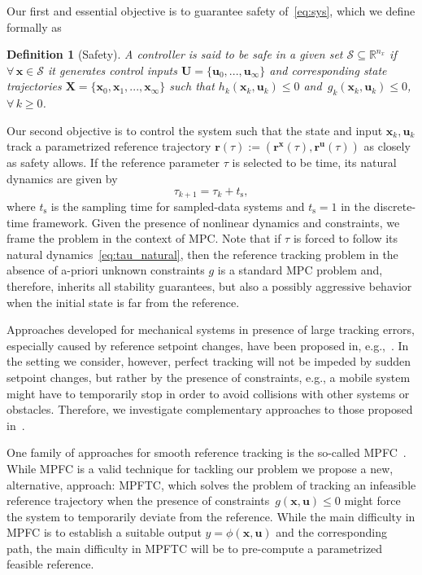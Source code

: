 \documentclass[journal]{IEEEtran}
\newcommand{\x}{{\mathbf{x}}}
\renewcommand{\u}{{\mathbf{u}}}
\renewcommand{\r}{{\mathbf{r}}}
\newcommand{\review}[1]{#1}
\newtheorem{Definition}{Definition}
\begin{document}
	Our first and essential objective is to guarantee safety of~\eqref{eq:sys}, which we define formally as
	
	\begin{Definition}[Safety]\label{def:safe}
		A controller is said to be safe in a given set $\mathcal{S}\subseteq\mathbb{R}^{n_x}$ if $\forall \, \x\in\mathcal{S}$ it generates control inputs $\mathbf{U}=\{\u_0,...,\u_\infty\}$ and corresponding state trajectories $\mathbf{X}=\{\x_0,\x_1,...,\x_\infty\}$ such that $h_k(\x_k,\u_k)\leq{}0$ and~$g_k(\x_k,\u_k)\leq{}0$, $\forall \, k \geq 0$.
	\end{Definition}
	\review{Our second objective is to control the system such that the state and input $\x_k, \u_k$ track a parametrized reference trajectory $\r(\tau)\review{:=}(\r^\x(\tau),\r^\u(\tau))$ as closely as safety allows.} If the reference parameter $\tau$ is selected to be time, its natural dynamics are given by
	\begin{equation}
	\label{eq:tau_natural}
	\tau_{k+1} = \tau_k + t_\mathrm{s},
	\end{equation}
	where $t_\mathrm{s}$ is the sampling time for sampled-data systems and $t_\mathrm{s}=1$ in the discrete-time framework. Given the presence of nonlinear dynamics and constraints, we frame the problem in the context of MPC.
	Note that if $\tau$ is forced to follow its natural dynamics~\eqref{eq:tau_natural}, then the reference tracking problem in the absence of a-priori unknown constraints $g$ is a standard MPC problem and, therefore, inherits all stability guarantees, but also a possibly aggressive behavior when the initial state is far from the reference.
	
	Approaches developed for mechanical systems in presence of large tracking errors, especially caused by reference setpoint changes, have been proposed in, e.g.,~\cite{Gros2017a}. In the setting we consider, however, perfect tracking will not be impeded by sudden setpoint changes, but rather by the presence of constraints, e.g., a mobile system might have to temporarily stop in order to avoid collisions with other systems or obstacles. Therefore, we investigate complementary approaches to those proposed in~\cite{Gros2017a}.
	
	
	
	One family of approaches for smooth reference tracking is the so-called MPFC~\cite{Faulwasser2009,Faulwasser2016}. While MPFC is a valid technique for tackling our problem we propose a new, alternative, approach: MPFTC, which 
	solves the problem of tracking an infeasible reference trajectory when the presence of constraints~$g(\x,\u)\leq0$ might force the system to temporarily deviate from the reference. 
	While the main difficulty in MPFC is to establish a suitable output $y=\phi(\x,\u)$ and the corresponding path, the main difficulty in MPFTC will be to pre-compute a parametrized feasible reference. 
	
\end{document}
